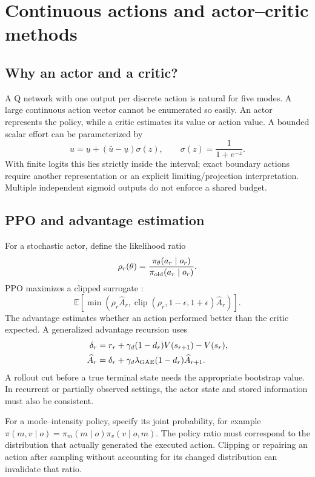 \documentclass[11pt,a4paper]{article}
\newcommand{\E}{\mathbb E}
\DeclareMathOperator{\clip}{clip}
\theoremstyle{definition}
\theoremstyle{remark}
\begin{document}
\section{Continuous actions and actor--critic methods}
\subsection{Why an actor and a critic?}
A Q network with one output per discrete action is natural for five modes. A large continuous action vector cannot be enumerated so easily. An actor represents the policy, while a critic estimates its value or action value. A bounded scalar effort can be parameterized by
\begin{equation}
u=\underline u+(\bar u-\underline u)\sigma(z),\qquad
\sigma(z)=\frac{1}{1+e^{-z}}.
\end{equation}
With finite logits this lies strictly inside the interval; exact boundary actions require another representation or an explicit limiting/projection interpretation. Multiple independent sigmoid outputs do not enforce a shared budget.

\subsection{PPO and advantage estimation}
For a stochastic actor, define the likelihood ratio
\begin{equation}
\rho_r(\theta)=\frac{\pi_\theta(a_r\mid o_r)}{\pi_{\rm old}(a_r\mid o_r)}.
\end{equation}
PPO maximizes a clipped surrogate \cite{ppo}:
\begin{equation}
\E\left[\min\left(\rho_r\widehat A_r,
\clip(\rho_r,1-\epsilon,1+\epsilon)\widehat A_r\right)\right].
\end{equation}
The advantage estimates whether an action performed better than the critic expected. A generalized advantage recursion uses
\begin{align}
\delta_r&=r_r+\gamma_d(1-d_r)V(s_{r+1})-V(s_r),\nonumber\\
\widehat A_r&=\delta_r+\gamma_d\lambda_{\rm GAE}(1-d_r)\widehat A_{r+1}.
\end{align}
A rollout cut before a true terminal state needs the appropriate bootstrap value. In recurrent or partially observed settings, the actor state and stored information must also be consistent.

For a mode--intensity policy, specify its joint probability, for example
$\pi(m,v\mid o)=\pi_m(m\mid o)\pi_v(v\mid o,m)$. The policy ratio must correspond to the distribution that actually generated the executed action. Clipping or repairing an action after sampling without accounting for its changed distribution can invalidate that ratio.
\end{document}
